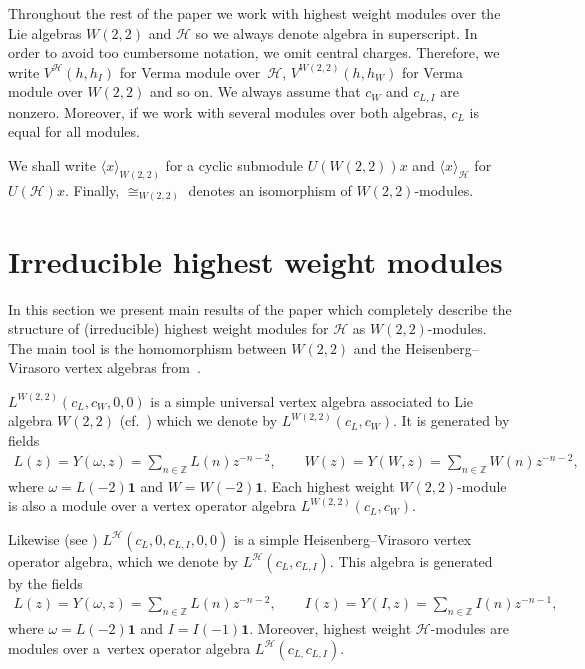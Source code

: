 \documentclass[pdftex]{sigma}
\numberwithin{equation}{section}
\newcommand{\Z}{\mathbb Z}
\newcommand{\HVir}{\mathcal H}
\begin{document}
\begin{Remark}
Throughout the rest of the paper we work with highest weight modules over the Lie algebras $W(2,2)$ and $\HVir$ so we always denote algebra in superscript. In order to avoid too cumbersome notation, we omit central charges. Therefore, we write $V^{\HVir}(h,h_{I}) $ for Verma module over~$\HVir$, ${V}^{W(2,2)}(h,h_{W}) $ for Verma module over $W(2,2)$ and so on. We always assume that $c_{W}$ and $c_{L,I}$ are nonzero. Moreover, if we work with several modules over both algebras, $c_{L}$ is equal for all modules.

We shall write $\langle x \rangle_{W(2,2)}$ for a cyclic submodule $U (W(2,2))x$ and $\langle x \rangle_{\HVir}$ for $U(\HVir)x$. Finally, $\cong_{W(2,2)}$ denotes an isomorphism of $W(2,2)$-modules.
\end{Remark}

\section{Irreducible highest weight modules}\label{result}
In this section we present main results of the paper which completely describe the structure of (irreducible) highest weight modules for $\HVir$ as $W(2,2)$-modules. The main tool is the homomorphism between $W(2,2)$ and the Heisenberg--Virasoro vertex algebras from~\cite{nas}.

$L^{W(2,2) }( c_{L},c_{W},0,0) $ is a simple universal vertex algebra associated to Lie algebra $W(2,2)$ (cf.\ \cite{R-JMP, Zhang-Dong}) which we denote by $L^{W(2,2)}(c_{L},c_{W})$. It is generated by f\/ields
\begin{gather*}
L(z)=Y(\omega ,z)=\sum_{n\in {\Z}}L(n)z^{-n-2},\qquad W(z)=Y(W,z)=\sum_{n\in {\Z}}W(n)z^{-n-2},
\end{gather*}
where $\omega =L(-2)\mathbf{1}$ and $W=W(-2)\mathbf{1}$. Each highest weight $W(2,2) $-module is also a module over a vertex operator algebra $L^{W(2,2) }(c_{L},c_{W})$.

Likewise (see \cite{Billig3}) $L^{\HVir}(c_{L},0,c_{L,I},0,0) $ is a simple Heisenberg--Virasoro vertex operator algebra, which we denote by $L^{\HVir}(c_{L},c_{L,I}) $. This algebra is generated by the f\/ields
\begin{gather*}
L(z)=Y(\omega ,z)=\sum_{n\in {\Z}}L(n)z^{-n-2},\qquad I(z)=Y(I,z)=\sum_{n\in {\Z}}I(n)z^{-n-1},
\end{gather*}
where $\omega =L(-2)\mathbf{1}$ and $I=I(-1)\mathbf{1}$. Moreover, highest weight $\HVir$-modules are modules over a~vertex operator algebra
$L^{\HVir}(c_{L,}c_{L,I})$.
\end{document}
